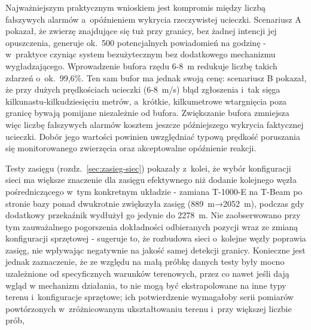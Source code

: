 Najważniejszym praktycznym wnioskiem jest kompromis między liczbą fałszywych alarmów
a~opóźnieniem wykrycia rzeczywistej ucieczki. Scenariusz A pokazał, że zwierzę znajdujące się tuż przy
granicy, bez żadnej intencji jej opuszczenia, generuje ok.\ 500 potencjalnych powiadomień na godzinę
- w~praktyce czyniąc system bezużytecznym bez dodatkowego mechanizmu wygładzającego. Wprowadzenie
bufora rzędu 6-8~m redukuje liczbę takich zdarzeń o~ok.\ 99,6\%. Ten sam
bufor ma jednak swoją cenę: scenariusz B pokazał, że przy dużych prędkościach ucieczki (6-8~m/s)
błąd zgłoszenia i~tak sięga kilkunastu-kilkudziesięciu metrów, a~krótkie, kilkumetrowe wtargnięcia
poza granicę bywają pomijane niezależnie od bufora. Zwiększanie bufora zmniejsza więc
liczbę fałszywych alarmów kosztem jeszcze późniejszego wykrycia faktycznej ucieczki. Dobór jego
wartości powinien uwzględniać typową prędkość poruszania się monitorowanego zwierzęcia oraz
akceptowalne opóźnienie reakcji.

Testy zasięgu (rozdz.~\ref{sec:zasieg-siec}) pokazały z~kolei, że wybór konfiguracji sieci ma
większe znaczenie dla zasięgu efektywnego niż dodanie kolejnego węzła pośredniczącego w~tym
konkretnym układzie - zamiana T-1000-E na T-Beam po stronie bazy ponad dwukrotnie zwiększyła zasięg
(889~m→2052~m), podczas gdy dodatkowy przekaźnik wydłużył go jedynie do 2278~m. Nie zaobserwowano przy tym zauważalnego pogorszenia 
dokładności odbieranych pozycji wraz ze zmianą konfiguracji sprzętowej - sugeruje to, że rozbudowa sieci o~kolejne węzły poprawia zasięg,
nie wpływając negatywnie na jakość samej detekcji granicy. Konieczne jest jednak zaznaczenie, że ze względu na małą próbkę danych testy 
były mocno uzależnione od specyficznych warunków terenowych, przez co nawet jeśli dają wgląd w mechanizm działania, to nie mogą być 
ekstrapolowane na inne typy terenu i~konfiguracje sprzętowe; ich potwierdzenie wymagałoby serii pomiarów powtórzonych w~zróżnicowanym 
ukształtowaniu terenu i~przy większej liczbie prób,
